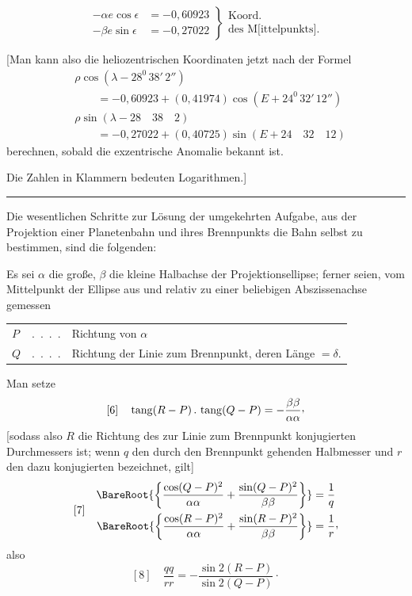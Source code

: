 \[
\left.\begin{aligned}
-\alpha e\cos\epsilon&=-0{,}60923\\
-\beta e\sin\epsilon&=-0{,}27022
\end{aligned}\right\}
\begin{array}{l}\text{Koord.}\\\text{des M[ittelpunkts].}\end{array}
\]

[Man kann also die heliozentrischen Koordinaten jetzt nach der Formel
\[
\begin{aligned}
&\rho\cos(\lambda-28^0\,38'\,2'')\\
&\qquad=-0{,}60923+(0{,}41974)\cos(E+24^0\,32'\,12'')\\
&\rho\sin(\lambda-28\quad38\quad2)\\
&\qquad=-0{,}27022+(0{,}40725)\sin(E+24\quad32\quad12)
\end{aligned}
\]
berechnen, sobald die exzentrische Anomalie bekannt ist.

Die Zahlen in Klammern bedeuten Logarithmen.]
\begin{center}\rule{.3\linewidth}{.4pt}\end{center}

Die wesentlichen Schritte zur Lösung der umgekehrten Aufgabe, aus der Projektion einer Planetenbahn und ihres Brennpunkts die Bahn selbst zu bestimmen, sind die folgenden:

Es sei \(\alpha\) die große, \(\beta\) die kleine Halbachse der Projektionsellipse; ferner seien, vom Mittelpunkt der Ellipse aus und relativ zu einer beliebigen Abszissenachse gemessen
\begin{center}
\begin{tabular}{@{}lcl@{}}
\(P\)&.\ .\ .\ .&Richtung von \(\alpha\)\\
\(Q\)&.\ .\ .\ .&\begin{minipage}[t]{.75\linewidth}Richtung der Linie zum Brennpunkt, deren Länge \(=\delta\).\end{minipage}
\end{tabular}
\end{center}

Man setze
\[
[6]\quad\operatorname{tang}(R-P)\,.\,\operatorname{tang}(Q-P)
=-\frac{\beta\beta}{\alpha\alpha}\mathpunct{\raisebox{.45ex}{,}}
\]
[sodass also \(R\) die Richtung des zur Linie zum Brennpunkt konjugierten Durchmessers ist; wenn \(q\) den durch den Brennpunkt gehenden Halbmesser und \(r\) den dazu konjugierten bezeichnet, gilt]
\[
[7]\quad\begin{aligned}
\BareRoot{\left\{\frac{\cos(Q-P)^2}{\alpha\alpha}+
\frac{\sin(Q-P)^2}{\beta\beta}\right\}}&=\frac{1}{q}\\
\BareRoot{\left\{\frac{\cos(R-P)^2}{\alpha\alpha}+
\frac{\sin(R-P)^2}{\beta\beta}\right\}}&=\frac{1}{r}\mathpunct{\raisebox{.45ex}{,}}
\end{aligned}
\]
also
\[
[8]\quad\frac{qq}{rr}=-\frac{\sin2(R-P)}{\sin2(Q-P)}\mathpunct{\cdot}
\]


